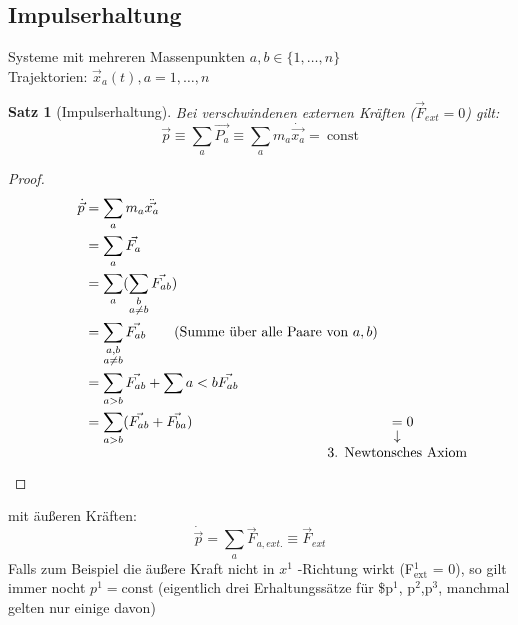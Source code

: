 \documentclass[a4paper]{scrartcl}
\renewcommand{\v}[1]{\vec{#1}}
\theoremstyle{definition}
\theoremstyle{plain}
\newtheorem{thm}{Satz}
\theoremstyle{remark}
\begin{document}
\subsection{Impulserhaltung}
\label{sec-4-1}
Systeme mit mehreren Massenpunkten $a,b\in\{1,\ldots, n\}$ \\
   Trajektorien: $\v x_a(t), a=1,\ldots,n$ \\
\begin{thm}[Impulserhaltung]
Bei verschwindenen externen Kräften ($\v F_{ext} = 0$) gilt:
\[\v p \equiv \sum_a \v{P_a} \equiv \sum_a m_a\dot{\v{x_a}} =~\text{const}\]
\end{thm}
\begin{proof}
\begin{align*}
\dot{\v p} &= \sum_a m_a \ddot{\v{x_a}} \\
&= \sum_a \v{F_a} \\
&= \sum_a(\sum_{\substack{b \\ a\neq b}} \v{F_{ab}}) \\
&= \sum_{\substack{a,b \\ a\neq b}} \v{F_{ab}} \tag{Summe über alle Paare von $a,b$} \\
&= \sum_{a > b}\v{F_{ab}} + \sum{a < b} \v{F_{ab}} \\
&= \sum_{a > b}(\v{F_{ab}} + \v{F_{ba}})
&\underarrow[=]{3. Newtonsches Axiom} 0 \tag*{\qedhere}
\end{align*}
\end{proof}

mit äußeren Kräften:
\[\dot{\v p} = \sum_a \v F_{a,ext.} \equiv \v F_{ext}\]
Falls zum Beispiel die äußere Kraft nicht in $x^1$ -Richtung wirkt (F$^{\text{1}}_{\text{ext}}$ = 0), so gilt immer nocht $p^1 = \text{const}$
(eigentlich drei Erhaltungssätze für \$p$^{\text{1}}$, p$^{\text{2}}$,p$^{\text{3}}$, manchmal gelten nur einige davon)
\end{document}

